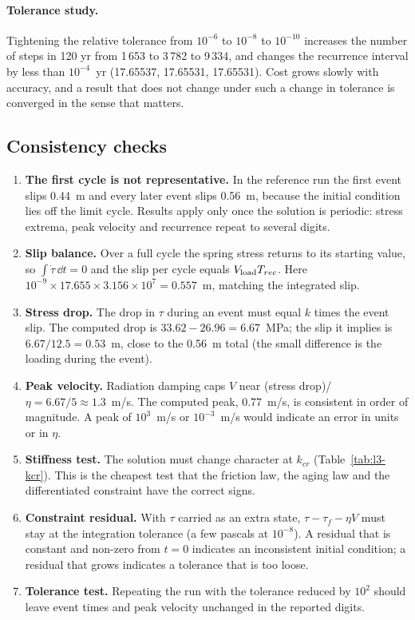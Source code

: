 \paragraph{Tolerance study.} Tightening the relative tolerance from $10^{-6}$ to $10^{-8}$ to $10^{-10}$ increases the number of steps in 120 yr from 1\,653 to 3\,782 to 9\,334, and changes the recurrence interval by less than $10^{-4}$~yr (17.65537, 17.65531, 17.65531). Cost grows slowly with accuracy, and a result that does not change under such a change in tolerance is converged in the sense that matters.

\subsection{Consistency checks}

\begin{enumerate}[itemsep=1pt,topsep=2pt]
\item \textbf{The first cycle is not representative.} In the reference run the first event slips 0.44~m and every later event slips 0.56~m, because the initial condition lies off the limit cycle. Results apply only once the solution is periodic: stress extrema, peak velocity and recurrence repeat to several digits.
\item \textbf{Slip balance.} Over a full cycle the spring stress returns to its starting value, so $\int\dot\tau\,\dd t=0$ and the slip per cycle equals $V_{\mathrm{load}} T_{rec}$. Here $10^{-9}\times17.655\times3.156\times10^{7}=0.557$~m, matching the integrated slip.
\item \textbf{Stress drop.} The drop in $\tau$ during an event must equal $k$ times the event slip. The computed drop is $33.62-26.96=6.67$~MPa; the slip it implies is $6.67/12.5=0.53$~m, close to the 0.56~m total (the small difference is the loading during the event).
\item \textbf{Peak velocity.} Radiation damping caps $V$ near (stress drop)/$\eta=6.67/5\approx1.3$~m/s. The computed peak, 0.77~m/s, is consistent in order of magnitude. A peak of $10^{3}$~m/s or $10^{-3}$~m/s would indicate an error in units or in $\eta$.
\item \textbf{Stiffness test.} The solution must change character at $k_{cr}$ (Table~\ref{tab:l3-kcr}). This is the cheapest test that the friction law, the aging law and the differentiated constraint have the correct signs.
\item \textbf{Constraint residual.} With $\tau$ carried as an extra state, $\tau-\tau_f-\eta V$ must stay at the integration tolerance (a few pascals at $10^{-8}$). A residual that is constant and non-zero from $t=0$ indicates an inconsistent initial condition; a residual that grows indicates a tolerance that is too loose.
\item \textbf{Tolerance test.} Repeating the run with the tolerance reduced by $10^2$ should leave event times and peak velocity unchanged in the reported digits.
\end{enumerate}

